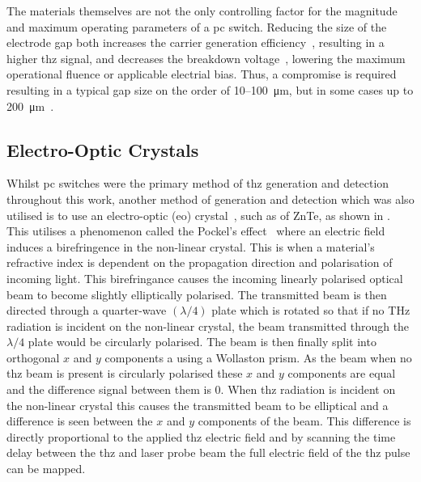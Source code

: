 The materials themselves are not the only controlling factor for the magnitude and maximum operating parameters of a \acrshort{pc} switch. Reducing the size of the electrode gap both increases the carrier generation efficiency~\cite{Tani2002}, resulting in a higher \acrshort{thz} signal, and decreases the breakdown voltage~\cite{Stone2004}, lowering the maximum operational fluence or applicable electrial bias. Thus, a compromise is required resulting in a typical gap size on the order of 10\nobreakdash--\SI{100}{\micro\metre}, but in some cases up to \SI{200}{\micro\metre}~\cite{Bacon2017}. 

\subsection{Electro-Optic Crystals}
Whilst \acrshort{pc} switches were the primary method of \acrshort{thz} generation and detection throughout this work, 
another method of generation and detection which was also utilised is to use an electro\nobreakdash-optic (\acrshort{eo}) crystal~\cite{Wu1995}, such as of ZnTe, as shown in . This utilises a phenomenon called the Pockel’s effect~\cite{vanderValk} where an electric field induces a birefringence in the non\nobreakdash-linear crystal. This is when a material's refractive index is dependent on the propagation direction and polarisation of incoming light. This birefringance causes the incoming linearly polarised optical beam to become slightly elliptically polarised. The transmitted beam is then directed through a quarter\nobreakdash-wave \((\lambda/4)\) plate which is rotated so that if no THz radiation is incident on the non\nobreakdash-linear crystal, the beam transmitted through the \(\lambda/4\) plate would be circularly polarised. The beam is then finally split into orthogonal \(x\) and \(y\) components a using a Wollaston prism. As the beam when no \acrshort{thz} beam is present is circularly polarised these \(x\) and \(y\) components are equal and the difference signal between them is 0. When \acrshort{thz} radiation is incident on the non\nobreakdash-linear crystal this causes the transmitted beam to be elliptical and a difference is seen between the \(x\) and \(y\) components of the beam. This difference is directly proportional to the applied \acrshort{thz} electric field and by scanning the time delay between the \acrshort{thz} and laser probe beam the full electric field of the \acrshort{thz} pulse can be mapped. 

